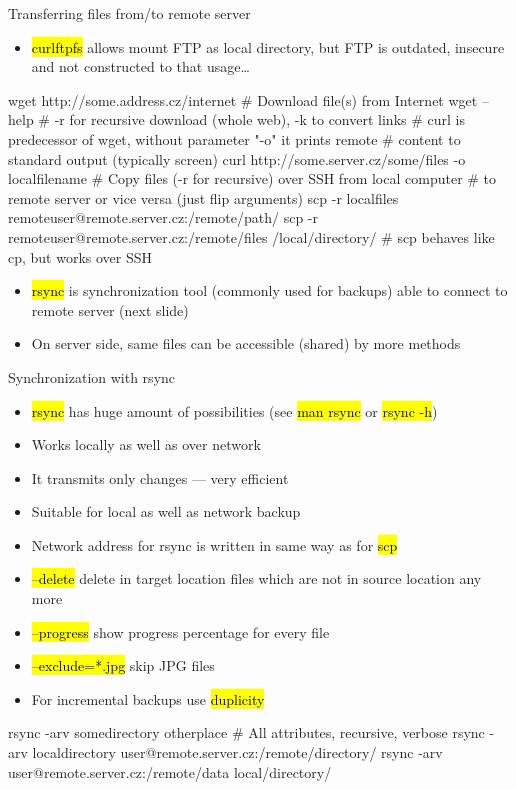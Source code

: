 \documentclass[compress, ucs, xelatex, 11pt, xcolor=svgnames,
  hyperref={
    bookmarks=true,
    unicode=true,
    colorlinks=true,
    pdftitle={Linux, command line and MetaCentrum},
    plainpages=false,
    pdfauthor={Vojtech Zeisek},
    pdfsubject={Course about use of Linux command line, writing shell scripts and using MetaCentrum of CESNET},
    pdfcreator={XeLaTeX},
    pdfkeywords={Linux, GNU, BASH, shell, command line, MetaCentrum},
    linkcolor=DarkRed,
    anchorcolor=DarkBlue,
    citecolor=Indigo,
    filecolor=NavyBlue,
    menucolor=DarkMagenta,
    urlcolor=DarkBlue,
    pdftex},
  url={hyphens, lowtilde} %
  ]{beamer}
\renewcommand{\texttt}[1]{\hl{\ttfamily #1}}
\begin{document}
\begin{frame}[fragile]{Transferring files from/to remote server}
  \label{transfers}
  \begin{itemize}
    \item \texttt{curlftpfs} allows mount FTP as local directory, but FTP is outdated, insecure and not constructed to that usage\ldots
  \end{itemize}
  \begin{bashcode}
    wget http://some.address.cz/internet # Download file(s) from Internet
    wget --help # -r for recursive download (whole web), -k to convert links
    # curl is predecessor of wget, without parameter "-o" it prints remote
    # content to standard output (typically screen)
    curl http://some.server.cz/some/files -o localfilename
    # Copy files (-r for recursive) over SSH from local computer
    # to remote server or vice versa (just flip arguments)
    scp -r localfiles remoteuser@remote.server.cz:/remote/path/
    scp -r remoteuser@remote.server.cz:/remote/files /local/directory/
    # scp behaves like cp, but works over SSH
  \end{bashcode}
  \begin{itemize}
    \item \texttt{rsync} is synchronization tool (commonly used for backups) able to connect to remote server (next slide)
    \item On server side, same files can be accessible (shared) by more methods
  \end{itemize}
\end{frame}

\begin{frame}[fragile]{Synchronization with rsync}
  \begin{itemize}
    \item \texttt{rsync} has huge amount of possibilities (see \texttt{man rsync} or \texttt{rsync -h})
    \item Works locally as well as over network
    \item It transmits only changes --- very efficient
    \item Suitable for local as well as network backup
    \item Network address for rsync is written in same way as for \texttt{scp}
    \item \texttt{--delete} delete in target location files which are not in source location any more
    \item \texttt{--progress} show progress percentage for every file
    \item \texttt{--exclude=*.jpg} skip JPG files
    \item For incremental backups use \texttt{duplicity}
  \end{itemize}
  \begin{bashcode}
    rsync -arv somedirectory otherplace # All attributes, recursive, verbose
    rsync -arv localdirectory user@remote.server.cz:/remote/directory/
    rsync -arv user@remote.server.cz:/remote/data local/directory/
  \end{bashcode}
\end{frame}
\end{document}

